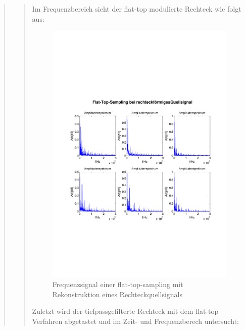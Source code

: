 \begin{quote}
\begin{quote}
      	    Im Frequenzbereich sieht der flat-top modulierte Rechteck wie folgt
      	    aus:
      	    
      	    \begin{figure}[H]
            \centering
            \includegraphics[scale=0.6, trim = 1.5cm 6cm 1cm 8cm,
            clip]{./Bilder/flat-top-recht_freq}
                \caption{Frequenzsignal einer flat-top-sampling mit
                Rekonstruktion eines Rechteckquellsignals}
      	    \end{figure}
      	    
      	    
      	    Zuletzt wird der tiefpassgefilterte Rechteck mit dem flat-top
      	    Verfahren abgetastet und im Zeit- und Frequenzberech untersucht:
      	    

\end{quote}
\end{quote}
